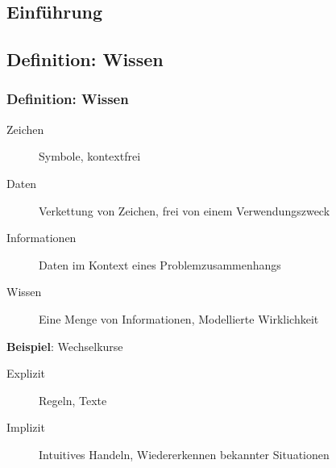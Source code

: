 


\subsection{Einführung}

\subsection{Definition: Wissen}
\begin{frame}[allowframebreaks]
\frametitle{Definition: Wissen}
\begin{description}
 \item[Zeichen] Symbole, kontextfrei
 \item[Daten] Verkettung von Zeichen, frei von einem Verwendungszweck
 \item[Informationen] Daten im Kontext eines Problemzusammenhangs
 \item[Wissen] Eine Menge von Informationen, Modellierte Wirklichkeit
\end{description}
\textbf{Beispiel}: Wechselkurse %
\framebreak
\begin{description}
 \item[Explizit] Regeln, Texte
 \item[Implizit] Intuitives Handeln, Wiedererkennen bekannter Situationen
\end{description}
\end{frame}

